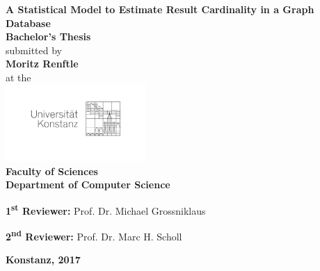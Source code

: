 \documentclass{scrreprt}
\begin{document}
\begin{titlepage}
\thispagestyle{empty}
\begin{center}
{\LARGE \textbf{A Statistical Model to Estimate Result Cardinality
                in a Graph Database}}
\\[1cm]
{\Large \textbf{Bachelor's Thesis}}
\\[1cm]
{\Large submitted by}
\\[0.5cm]
{\LARGE \textbf{Moritz Renftle}}
\\[0.5cm]
{\Large at the}
\\[0.5cm]
\includegraphics[width=0.4\textwidth]{figures/uni_kn_logo.pdf}
\\[1cm]
{\Large \textbf{Faculty of Sciences}}
\\[1cm]
{\Large \textbf{Department of Computer Science}}
\\[2cm]
\begin{minipage}[c]{0.8\textwidth}
\begin{description}[style=multiline]
 \item {\Large \textbf{1\textsuperscript{st} Reviewer:} Prof. Dr. Michael Grossniklaus}
 \item {\Large \textbf{2\textsuperscript{nd} Reviewer:} Prof. Dr. Marc H. Scholl}
\end{description}
\end{minipage}
\vfill
{\LARGE \textbf{Konstanz, 2017}}
\end{center}
\end{titlepage}
\end{document}
